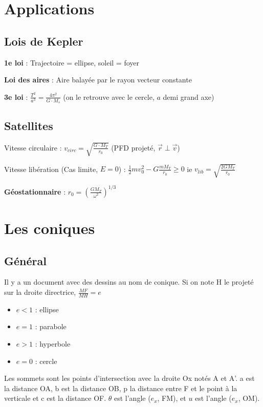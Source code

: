 \documentclass[9pt]{article}
\begin{document}
\begin{multicols*}{2}
\section{Applications}
\subsection{Lois de Kepler}
\textbf{1e loi} : Trajectoire = ellipse, soleil = foyer

\textbf{Loi des aires} : Aire balayée par le rayon vecteur constante

\textbf{3e loi} : $\displaystyle \frac{T^2}{a^3} = \frac{4\pi^2}{G \cdot M_s} $ (on le retrouve avec le cercle, $a$ demi grand axe)

\subsection{Satellites}
Vitesse circulaire : $v_{circ}=\sqrt{\frac{G \cdot M_T}{r_0} }$ (PFD projeté, $\overrightarrow{r} \perp \overrightarrow{v} $)

Vitesse libération (Cas limite, $E=0$) : $\frac{1}{2} m v_0^2 - G \frac{m M_T}{r_0} \ge 0$ ie $v_{lib} = \sqrt{\frac{2GM_T}{r_0} }$

\textbf{Géostationnaire} : $r_0 = \left( \frac{GM_T}{\omega^2} \right)^{1/3}$

\section{Les coniques}

\subsection{Général}
Il y a un document avec des dessins au nom de conique. Si on note H le projeté sur la droite directrice,
$\frac{MF}{MH} = e$
\begin{itemize}
  \item $e<1$ : ellipse
  \item $e=1$ : parabole
  \item $e>1$ : hyperbole
  \item $e=0$ : cercle
\end{itemize}
Les sommets sont les points d'intersection avec la droite Ox notés A et A'. a est la distance OA, b est la distance OB, p la distance entre F et le point à la verticale et c est la distance OF. $\theta$ est l'angle ($e_x$, FM), et $u$ est l'angle ($e_x$, OM).


\end{multicols*}
\end{document}
